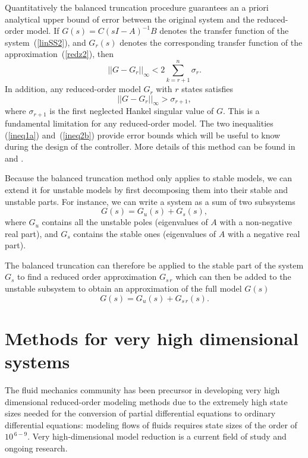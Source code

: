 \documentclass[12pt,lot, lof]{puthesis}
\begin{document}
Quantitatively the balanced truncation procedure guarantees an a priori analytical upper bound of error between the original system and the reduced-order model.  If $G(s)=C(sI-A)^{-1}B$ denotes the transfer function of the system~(\ref{linSS2}), and $G_r(s)$ denotes the corresponding transfer function of the approximation~(\ref{redz2}), then 
\begin{equation}
\label{ineq1a}
|| G - G_r||_{\infty} < 2 \sum_{k= r+1} ^n \sigma_r.
\end{equation}
In addition, any reduced-order model $G_r$ with $r$ states satisfies 
 \begin{equation}
 \label{ineq2b}
|| G - G_r||_{\infty} > \sigma_{r+1},
\end{equation}
where $ \sigma_{r+1}$ is the first neglected Hankel singular value of $G$. This is a fundamental limitation for any reduced-order model. The two inequalities (\ref{ineq1a}) and~(\ref{ineq2b}) provide error bounds which will be useful to know during the design of the controller. 
More details of this method can be found in \cite{Glover84} and \cite{SandP}.

Because the balanced truncation method only applies to stable models, we can extend it for unstable models by first decomposing them into their stable and unstable parts.
For instance, we can write a system as a sum of two subsystems
\begin{equation}
G(s) = G_u(s)+ G_s(s),
\end{equation}
where $G_u$ contains all the unstable poles (eigenvalues of $A$ with a non-negative real part), and $G_s$ contains the stable ones (eigenvalues of $A$ with a negative real part).

The balanced truncation can therefore be applied to the stable part of the system $G_s$ to find a reduced order approximation $G_{s \, r}$
which can then be added to the unstable subsystem to obtain an approximation of the full model $G(s)$
\begin{equation}
G(s) = G_u(s)+ G_{s \, r}(s).
\end{equation}


\section{Methods for very high dimensional systems}
\label{highdim}

The fluid mechanics community has been precursor in developing very high dimensional reduced-order modeling methods due to the extremely high state sizes needed for the conversion of partial differential equations to ordinary differential equations: modeling flows of fluids requires state sizes of the order of $10^{\, 6-9}$. Very high-dimensional model reduction is a current field of study and ongoing research. 
\end{document}
